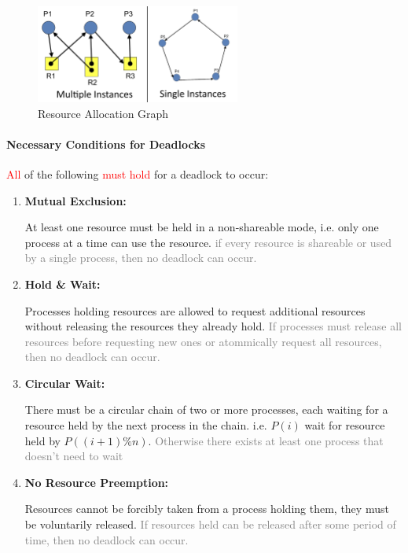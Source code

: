 \documentclass[openany,12pt]{book}
\newcommand{\red}[1]{\textcolor{Red}{#1}}
\newcommand{\gray}[1]{\textcolor{gray}{#1}}
\begin{document}
\begin{figure}[H]
    \centering
    \includegraphics[width=0.6\textwidth]{ResourceGraph.png}
    \caption{Resource Allocation Graph}
    \label{fig:Resource_Allocation_Graph}
\end{figure}


\paragraph{Necessary Conditions for Deadlocks} \red{All} of the following \red{must hold} for a deadlock to occur:
\begin{enumerate}
    \item \textbf{Mutual Exclusion:} \par
          At least one resource must be held in a non-shareable mode, i.e. only one process at a time can use the resource. \gray{if every resource is shareable or used by a single process, then no deadlock can occur.}

    \item \textbf{Hold \& Wait:} \par
          Processes holding resources are allowed to request additional resources without releasing the resources they already hold. \gray{If processes must release all resources before requesting new ones or atommically request all resources, then no deadlock can occur.}

    \item \textbf{Circular Wait:} \par
          There must be a circular chain of two or more processes, each waiting for a resource held by the next process in the chain. i.e. \(P(i)\) wait for resource held by \(P((i+1)\%n)\). \gray{Otherwise there exists at least one process that doesn't need to wait}

    \item \textbf{No Resource Preemption:} \par
          Resources cannot be forcibly taken from a process holding them, they must be voluntarily released. \gray{If resources held can be released after some period of time, then no deadlock can occur.}
\end{enumerate}
\end{document}
